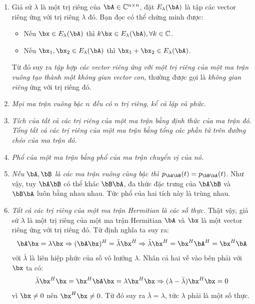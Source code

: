 \def\ElA{E_{\lambda}(\bA)}
\begin{enumerate}
    \item Giả sử $\lambda$ là một trị riêng của $\bA \in \mathbb{C}^{n\times n}$, đặt $\ElA$ là tập các vector riêng ứng với trị riêng $\lambda$ đó. Bạn đọc có thể chứng minh được: 
    \begin{itemize}
        \item Nếu $\bx \in \ElA$ thì $k\bx \in \ElA, \forall k \in \mathbb{C}$.

        \item Nếu $\bx_1, \bx_2 \in \ElA$ thì $\bx_1 + \bx_2 \in \ElA$.
    \end{itemize}
    Từ đó suy ra \textit{tập hợp các vector riêng ứng với một trị riêng của một
        ma trận vuông tạo thành một không gian vector con}, thường được gọi là
        \textit{không gian riêng} ứng với trị riêng đó.

    \item \textit{Mọi ma trận vuông bậc $n$ đều có $n$ trị riêng, kể cả lặp và phức.} 

    \item \textit{Tích của tất cả các trị riêng của một ma trận bằng định thức
        của ma trận đó. Tổng tất cả các trị riêng của một ma trận bằng tổng các
        phần tử trên đường chéo của ma trận đó.}


    \item \textit{Phổ của một ma trận bằng phổ của ma trận chuyển vị của nó.}


    \item \textit{Nếu $\bA, \bB$ là các ma trận vuông cùng bậc thì
        $p_{\bA\bB}(t) = p_ {\bB\bA}(t)$}. Như vậy, tuy $\bA\bB$ có thể khác
        $\bB\bA$, đa thức đặc trưng của $\bA\bB$ và $\bB\bA$ luôn bằng nhau
        nhau. Tức phổ của hai tích này là trùng nhau.

    \item \textit{Tất cả các trị riêng của một ma trận Hermitian là các số
    thực.} Thật vậy, giả sử $\lambda$ là một trị riêng của một ma trận Hermitian $\bA$ và $\bx$ là một vector riêng ứng với trị riêng đó. Từ định nghĩa ta
    suy ra:
    \begin{equation}
        \bA\bx = \lambda\bx \Rightarrow (\bA\bx)^H = \bar{\lambda} \bx^H
        \Rightarrow  \bar{\lambda}\bx^H = \bx^H\bA^H = \bx^H\bA
    \end{equation}
    với $\bar{\lambda}$ là liên hiệp phức của số vô hướng $\lambda$. Nhân cả hai
    vế vào bên phải với $\bx$ ta có:
    \begin{equation}
        \bar{\lambda}\bx^H\bx = \bx^H\bA\bx = \lambda \bx^H \bx \Rightarrow
        (\lambda - \bar{\lambda})\bx^H\bx = 0
    \end{equation}
    vì $\bx \neq 0$ nên $\bx^H\bx \neq 0$. Từ đó suy ra $\bar{\lambda} =
    \lambda$, tức $\lambda$ phải là một số thực.


\end{enumerate}
